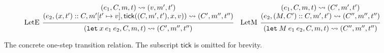 \documentclass[acmsmall,review]{acmart}\settopmatter{printfolios=true,printccs=false,printacmref=false}
\theoremstyle{definition}
\newcommand*{\cons}{::}
\newcommand*{\mem}{m}
\newcommand*{\tick}{\mathsf{tick}}
\begin{document}
\begin{figure}[h!]
  \[
    \begin{prooftree}
      \hypo{
        \begin{matrix}
          (e_{1}, C, \mem, t)
          \rightsquigarrow
          (v, \mem', t') \\
          (e_{2}, (x, t')\cons C, \mem'[t'\mapsto v], \tick((C,\mem',t'),x,v))
          \rightsquigarrow
          (C', \mem'', t'')
        \end{matrix}
      }
      \infer[left label=LetE]1{
      (\mathtt{let}\:x\:e_1\:e_2, C, \mem, t)
      \rightsquigarrow
      (C', \mem'', t'')
      }
    \end{prooftree}\quad
    \begin{prooftree}
      \hypo{
        \begin{matrix}
          (e_{1}, C, \mem, t)
          \rightsquigarrow
          (C', \mem', t') \\
          (e_{2}, (M, C')\cons C, \mem', t')
          \rightsquigarrow
          (C'', \mem'', t'')
        \end{matrix}
      }
      \infer[left label=LetM]1{
      (\mathtt{let}\:M\:e_{1}\:e_{2}, C, \mem, t)
      \rightsquigarrow
      (C'', \mem'', t'')
      }
    \end{prooftree}
  \]
  \caption{The concrete one-step transition relation. The subscript $\tick$ is omitted for brevity.}
  \label{fig:concreach}
\end{figure}
\end{document}
